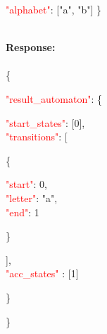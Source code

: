    \begin{adjustwidth}{7.5 mm}{0 cm}
    \textcolor{red}{"alphabet"}: ["a", "b"] \}
    \end{adjustwidth}
\ \\
\textbf{Response:}\\
\ \\
 \{
 \begin{adjustwidth}{7.5 mm}{0 cm}
    \textcolor{red}{"result\_automaton"}: \{
        \begin{adjustwidth}{7.5 mm}{0 cm}
            \textcolor{red}{"start\_states"}: [0],\\
            \textcolor{red}{"transitions"}: [
            \begin{adjustwidth}{7.5 mm}{0 cm}
            \{
               \begin{adjustwidth}{7.5 mm}{0 cm}
                    \textcolor{red}{"start"}: 0,\\
                    \textcolor{red}{"letter"}: "a",\\
                    \textcolor{red}{"end"}: 1
               \end{adjustwidth}
            \}
            \end{adjustwidth}
            ],\\
        \textcolor{red}{"acc\_states" }: [1]
    \end{adjustwidth}
    \}
\end{adjustwidth}
\}



